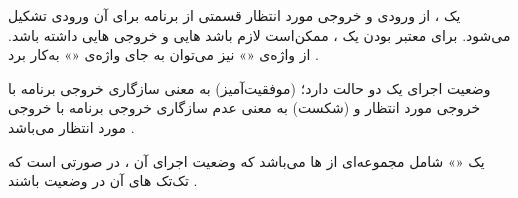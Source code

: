 
یک ، از ورودی و خروجی مورد انتظار قسمتی از برنامه برای
آن ورودی تشکیل می‌شود. برای معتبر بودن یک ، ممکن‌است لازم
باشد ‌هایی و خروجی ‌هایی داشته
باشد. از واژه‌ی «» نیز می‌توان به جای واژه‌ی «»
به‌کار برد .

وضعیت اجرای یک  دو حالت دارد؛  (موفقیت‌آمیز) به
معنی سازگاری خروجی برنامه با خروجی مورد انتظار و  (شکست) به
معنی عدم سازگاری خروجی برنامه با خروجی مورد انتظار می‌باشد
.

یک «» شامل مجموعه‌ای از ‌ها می‌باشد که وضعیت
اجرای آن ، در صورتی  است که تک‌تک
‌های آن در وضعیت  باشند .


